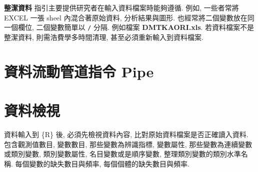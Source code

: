 \documentclass[
]{book}
\begin{document}
\textbf{整潔資料} 指引主要提供研究者在輸入資料檔案時能夠遵循.
例如, 一些者常將 EXCEL 一張 sheel 內混合著原始資料, 分析結果與圖形.
也經常將二個變數放在同一個欄位, 二個變數簡單以 \texttt{/} 分隔.
例如檔案 \textbf{DMTKAORI.xls}.
若資料檔案不是整潔資料, 則需浩費學多時間清理, 甚至必須重新輸入到資料檔案.

\hypertarget{ux8cc7ux6599ux6d41ux52d5ux7ba1ux9053ux6307ux4ee4-pipe}{%
\section{資料流動管道指令 Pipe}\label{ux8cc7ux6599ux6d41ux52d5ux7ba1ux9053ux6307ux4ee4-pipe}}

\hypertarget{ux8cc7ux6599ux6aa2ux8996}{%
\section{資料檢視}\label{ux8cc7ux6599ux6aa2ux8996}}

資料輸入到 \{R\} 後,
必須先檢視資料內容, 比對原始資料檔案是否正確讀入資料.
包含觀測值數目, 變數數目,
那些變數為辨識指標,
變數屬性, 那些變數為連續變數或類別變數,
類別變數屬性, 名目變數或是順序變數,
整理類別變數的類別水準名稱.
每個變數的缺失數目與頻率,
每個個體的缺失數目與頻率.

  
\end{document}
